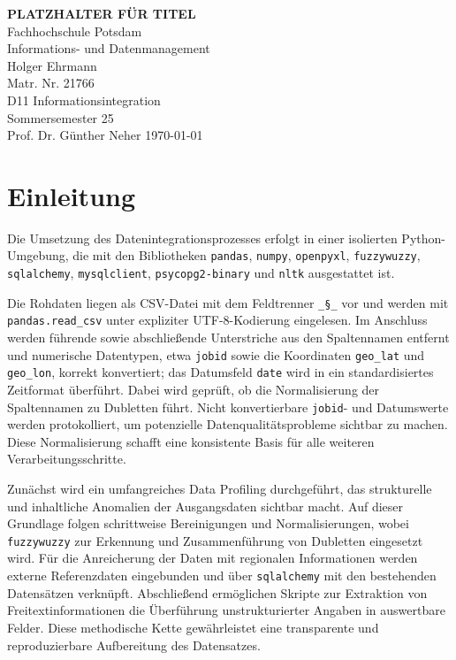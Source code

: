 \documentclass[
    a4paper,
    12pt,
    headinclude=true,
    BCOR=10mm,
]{scrreprt}
\begin{document}
\begin{titlepage}
    \centering
    \vspace*{1cm}
    \Large{\textbf{PLATZHALTER FÜR TITEL}}\\
    \vspace{1.5cm}
    \Large{Fachhochschule Potsdam}\\
    \vspace{0.5cm}
    \large{Informations- und Datenmanagement}\\
    \vspace{1.5cm}
    Holger Ehrmann\\
    Matr. Nr. 21766\\
    \vspace{1cm}
    D11 Informationsintegration\\
    Sommersemester 25\\
    Prof. Dr. Günther Neher
    \vfill
    \today
\end{titlepage}
\setcounter{tocdepth}{1}
\begingroup
{} %
{\small \tableofcontents}
\endgroup

\chapter{Einleitung}

Die Umsetzung des Datenintegrationsprozesses erfolgt in einer isolierten Python-Umgebung, die mit den Bibliotheken \texttt{pandas}, \texttt{numpy}, \texttt{openpyxl}, \texttt{fuzzywuzzy}, \texttt{sqlalchemy}, \texttt{mysqlclient}, \texttt{psycopg2-binary} und \texttt{nltk} ausgestattet ist.

Die Rohdaten liegen als CSV-Datei mit dem Feldtrenner \texttt{\_§\_} vor und werden mit \texttt{pandas.read\_csv} unter expliziter UTF-8-Kodierung eingelesen. Im Anschluss werden führende sowie abschließende Unterstriche aus den Spaltennamen entfernt und numerische Datentypen, etwa \texttt{jobid} sowie die Koordinaten \texttt{geo\_lat} und \texttt{geo\_lon}, korrekt konvertiert; das Datumsfeld \texttt{date} wird in ein standardisiertes Zeitformat überführt. Dabei wird geprüft, ob die Normalisierung der Spaltennamen zu Dubletten führt. Nicht konvertierbare \texttt{jobid}- und Datumswerte werden protokolliert, um potenzielle Datenqualitätsprobleme sichtbar zu machen. Diese Normalisierung schafft eine konsistente Basis für alle weiteren Verarbeitungsschritte.

Zunächst wird ein umfangreiches Data Profiling durchgeführt, das strukturelle und inhaltliche Anomalien der Ausgangsdaten sichtbar macht. Auf dieser Grundlage folgen schrittweise Bereinigungen und Normalisierungen, wobei \texttt{fuzzywuzzy} zur Erkennung und Zusammenführung von Dubletten eingesetzt wird. Für die Anreicherung der Daten mit regionalen Informationen werden externe Referenzdaten eingebunden und über \texttt{sqlalchemy} mit den bestehenden Datensätzen verknüpft. Abschließend ermöglichen Skripte zur Extraktion von Freitextinformationen die Überführung unstrukturierter Angaben in auswertbare Felder. Diese methodische Kette gewährleistet eine transparente und reproduzierbare Aufbereitung des Datensatzes.
\end{document}
